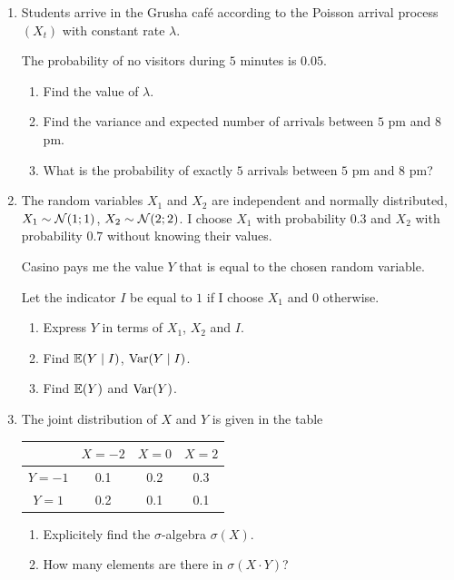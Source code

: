 \begin{enumerate}
  \begin{enumerate}
    \item Find $\E(X_n)$ and $\Var(X_n)$.
    \item Find the probability limit $\plim X_n$.
  \end{enumerate}
  
  \item Students arrive in the Grusha café according to the Poisson arrival process $(X_t)$ 
  with constant rate $\lambda$. 

  The probability of no visitors during $5$ minutes is $0.05$. 
  
  \begin{enumerate}
    \item Find the value of $\lambda$.
    \item Find the variance and expected number of arrivals between $5$ pm and $8$ pm. 
    \item What is the probability of exactly $5$ arrivals between $5$ pm and $8$ pm?
  \end{enumerate}

  \item 
  The random variables $X_1$ and $X_2$ are independent and normally distributed, 
  $X_1 \sim \mathcal{N}(1;1)$, $X_2 \sim \mathcal{N}(2;2)$. 
  I choose $X_1$ with probability $0.3$ and $X_2$ with probability $0.7$ without knowing their values.
  
  Casino pays me the value $Y$ that is equal to the chosen random variable. 

  Let the indicator $I$ be equal to $1$ if I choose $X_1$ and $0$ otherwise. 

  \begin{enumerate}
    \item Express $Y$ in terms of $X_1$, $X_2$ and $I$.
    \item Find $\operatorname{\mathbb{E}}(Y \mid I)$, $\operatorname{Var}(Y \mid I)$.
    \item Find $\operatorname{\mathbb{E}}(Y)$ and $\operatorname{Var}(Y)$. 
  \end{enumerate}

  \item The joint distribution of $X$ and $Y$ is given in the table
    
    \begin{tabular}{*{4}{c}}
    \toprule
    & $X=-2$ & $X=0$ & $X=2$ \\
    \midrule
    $Y=-1$ & 0.1 & 0.2 & 0.3  \\
    $Y=1$ & 0.2 & 0.1 & 0.1  \\
    \bottomrule
    \end{tabular}
    
    \begin{enumerate}
     \item Explicitely find the $\sigma$-algebra $\sigma(X)$.
     \item How many elements are there in $\sigma(X \cdot Y)$?
    \end{enumerate}
    
\end{enumerate} %


